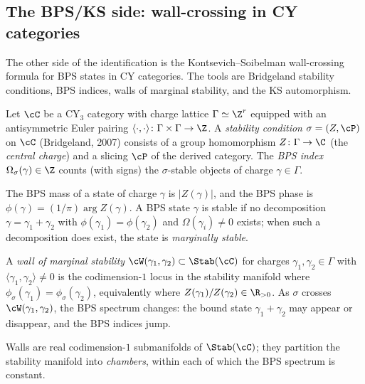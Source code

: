 \subsection{The BPS/KS side: wall-crossing in CY categories}
\label{subsec:ks-side}
%
%

The other side of the identification is the Kontsevich--Soibelman wall-crossing formula for BPS states in CY categories. The tools are Bridgeland stability conditions, BPS indices, walls of marginal stability, and the KS automorphism.

\begin{definition}
\label{def:bps-spectrum}
Let $\cC$ be a CY$_3$ category with charge lattice $\Gamma \simeq \Z^r$ equipped with an antisymmetric Euler pairing $\langle \cdot, \cdot \rangle \colon \Gamma \times \Gamma \to \Z$. A \emph{stability condition} $\sigma = (Z, \cP)$ on $\cC$ (Bridgeland, 2007) consists of a group homomorphism $Z \colon \Gamma \to \C$ (the \emph{central charge}) and a slicing $\cP$ of the derived category. The \emph{BPS index} $\Omega_\sigma(\gamma) \in \Z$ counts (with signs) the $\sigma$-stable objects of charge $\gamma \in \Gamma$.

The BPS mass of a state of charge $\gamma$ is $|Z(\gamma)|$, and the BPS phase is $\phi(\gamma) = (1/\pi) \arg Z(\gamma)$. A BPS state $\gamma$ is stable if no decomposition $\gamma = \gamma_1 + \gamma_2$ with $\phi(\gamma_1) = \phi(\gamma_2)$ and $\Omega(\gamma_i) \neq 0$ exists; when such a decomposition does exist, the state is \emph{marginally stable}.
\end{definition}

\begin{definition}
\label{def:walls-marginal-stability}
%
A \emph{wall of marginal stability} $\cW(\gamma_1, \gamma_2) \subset \Stab(\cC)$ for charges $\gamma_1, \gamma_2 \in \Gamma$ with $\langle \gamma_1, \gamma_2 \rangle \neq 0$ is the codimension-$1$ locus in the stability manifold where $\phi_\sigma(\gamma_1) = \phi_\sigma(\gamma_2)$, equivalently where $Z(\gamma_1)/Z(\gamma_2) \in \R_{>0}$. As $\sigma$ crosses $\cW(\gamma_1, \gamma_2)$, the BPS spectrum changes: the bound state $\gamma_1 + \gamma_2$ may appear or disappear, and the BPS indices jump.

Walls are real codimension-$1$ submanifolds of $\Stab(\cC)$; they partition the stability manifold into \emph{chambers}, within each of which the BPS spectrum is constant.
\end{definition}

